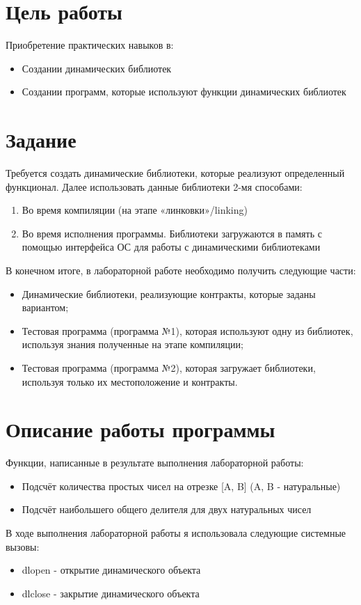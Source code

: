 \documentclass[a4paper, 12pt]{article}
\begin{document}
\section{Цель работы}
Приобретение практических навыков в:
\begin{itemize}
  \item Создании динамических библиотек
  \item Создании программ, которые используют функции динамических библиотек
\end{itemize}

\section{Задание}
Требуется создать динамические библиотеки, которые реализуют определенный функционал. Далее использовать данные библиотеки 2-мя способами:
\begin{enumerate}
  \item Во время компиляции (на этапе «линковки»/linking)
  \item Во время исполнения программы. Библиотеки загружаются в память с помощью интерфейса ОС для работы с динамическими библиотеками
\end{enumerate}
В конечном итоге, в лабораторной работе необходимо получить следующие части:
\begin{itemize}
  \item Динамические библиотеки, реализующие контракты, которые заданы вариантом;
  \item Тестовая программа (программа №1), которая используют одну из библиотек, используя знания полученные на этапе компиляции;
  \item Тестовая программа (программа №2), которая загружает библиотеки, используя только их местоположение и контракты.
\end{itemize}

\section{Описание работы программы}
Функции, написанные в результате выполнения лабораторной работы:
\begin{itemize}
  \item Подсчёт количества простых чисел на отрезке [A, B] (A, B - натуральные)
  \item Подсчёт наибольшего общего делителя для двух натуральных чисел
\end{itemize}

В ходе выполнения лабораторной работы я использовала следующие системные вызовы:
\begin{itemize}
  \item dlopen - открытие динамического объекта
  \item dlclose - закрытие динамического объекта
\end{itemize}
\end{document}
